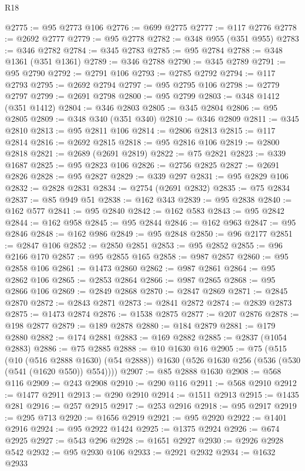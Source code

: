 \begin{lexlean}{R18}
\begin{coremodule}
@2775 := @95 @2773 @106
@2776 := @699 @2775
@2777 := @117 @2776
@2778 := @2692 @2777
@2779 := @95 @2778
@2782 := @348 @955 (@351 @955)
@2783 := @346 @2782
@2784 := @345 @2783
@2785 := @95 @2784
@2788 := @348 @1361 (@351 @1361)
@2789 := @346 @2788
@2790 := @345 @2789
@2791 := @95 @2790
@2792 := @2791 @106
@2793 := @2785 @2792
@2794 := @117 @2793
@2795 := @2692 @2794
@2797 := @95 @2795 @106
@2798 := @2779 @2797
@2799 := @2691 @2798
@2800 := @95 @2799
@2803 := @348 @1412 (@351 @1412)
@2804 := @346 @2803
@2805 := @345 @2804
@2806 := @95 @2805
@2809 := @348 @340 (@351 @340)
@2810 := @346 @2809
@2811 := @345 @2810
@2813 := @95 @2811 @106
@2814 := @2806 @2813
@2815 := @117 @2814
@2816 := @2692 @2815
@2818 := @95 @2816 @106
@2819 := @2800 @2818
@2821 := @2689 (@2691 @2819)
@2822 := @75 @2821
@2823 := @339 @1687
@2825 := @95 @2823 @106
@2826 := @2756 @2825
@2827 := @2691 @2826
@2828 := @95 @2827
@2829 := @339 @297
@2831 := @95 @2829 @106
@2832 := @2828 @2831
@2834 := @2754 (@2691 @2832)
@2835 := @75 @2834
@2837 := @85 @949 @51
@2838 := @162 @343
@2839 := @95 @2838
@2840 := @162 @577
@2841 := @95 @2840
@2842 := @162 @583
@2843 := @95 @2842
@2844 := @162 @958
@2845 := @95 @2844
@2846 := @162 @963
@2847 := @95 @2846
@2848 := @162 @986
@2849 := @95 @2848
@2850 := @96 @2177
@2851 := @2847 @106
@2852 := @2850 @2851
@2853 := @95 @2852
@2855 := @96 @2166 @170
@2857 := @95 @2855 @165
@2858 := @987 @2857
@2860 := @95 @2858 @106
@2861 := @1473 @2860
@2862 := @987 @2861
@2864 := @95 @2862 @106
@2865 := @2853 @2864
@2866 := @987 @2865
@2868 := @95 @2866 @106
@2869 := @2849 @2868
@2870 := @2847 @2869
@2871 := @2845 @2870
@2872 := @2843 @2871
@2873 := @2841 @2872
@2874 := @2839 @2873
@2875 := @1473 @2874
@2876 := @1538 @2875
@2877 := @207 @2876
@2878 := @198 @2877
@2879 := @189 @2878
@2880 := @184 @2879
@2881 := @179 @2880
@2882 := @174 @2881
@2883 := @169 @2882
@2885 := @2837 (@1054 @2883)
@2886 := @75 @2885
@2888 := @10 @1630 @16
@2905 := @75
    (@515
      (@10 (@516 @2888 @1630) (@54 @2888))
      @1630
      (@526 @1630 @256 (@536 (@530 (@541 (@1620 @550)) @554))))
@2907 := @85 @2888 @1630
@2908 := @568 @116
@2909 := @243 @2908
@2910 := @290 @116
@2911 := @568 @2910
@2912 := @1477 @2911
@2913 := @290 @2910
@2914 := @1511 @2913
@2915 := @1435 @281
@2916 := @257 @2915
@2917 := @253 @2916
@2918 := @95 @2917
@2919 := @295 @713
@2920 := @1656 @2919
@2921 := @95 @2920
@2922 := @1401 @2916
@2924 := @95 @2922 @1424
@2925 := @1375 @2924
@2926 := @674 @2925
@2927 := @543 @296
@2928 := @1651 @2927
@2930 := @2926 @2928 @542
@2932 := @95 @2930 @106
@2933 := @2921 @2932
@2934 := @1632 @2933

\end{coremodule}
\end{lexlean}
